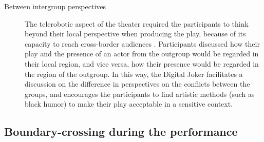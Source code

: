 \documentclass[dissertation,math,vertlayout,pdfa,colorlinks,nologo]{aaltoseries}
\begin{document}
\begin{description}
   \item[Between intergroup perspectives] The telerobotic aspect of the theater required the participants to think beyond their local perspective when producing the play, because of its capacity to reach cross-border audiences \cite[p. 15]{peledTeleroboticTheaterOppressed2025}. Participants discussed how their play and the presence of an actor from the outgroup would be regarded in their local region, and vice versa, how their presence would be regarded in the region of the outgroup. In this way, the Digital Joker facilitates a discussion on the difference in perspectives on the conflicts between the groups, and encourages the participants to find artistic methods (such as black humor) to make their play acceptable in a sensitive context.
\end{description}
\subsection{Boundary-crossing during the performance}
\end{document}
